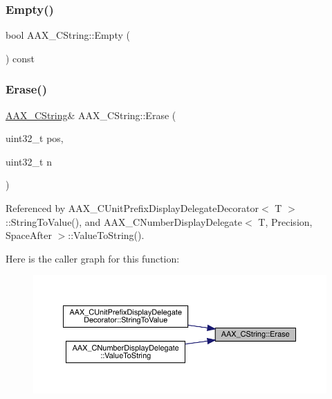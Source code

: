 \subsubsection{\texorpdfstring{Empty()}{Empty()}}
{\footnotesize\ttfamily bool A\+A\+X\+\_\+\+C\+String\+::\+Empty (\begin{DoxyParamCaption}{ }\end{DoxyParamCaption}) const}

\mbox{\label{a01573_a78ab9164c3b4aa17d13191fc7ea14fc0}} 
\subsubsection{\texorpdfstring{Erase()}{Erase()}}
{\footnotesize\ttfamily \mbox{\hyperlink{a01573}{A\+A\+X\+\_\+\+C\+String}}\& A\+A\+X\+\_\+\+C\+String\+::\+Erase (\begin{DoxyParamCaption}\item[{uint32\+\_\+t}]{pos,  }\item[{uint32\+\_\+t}]{n }\end{DoxyParamCaption})}



Referenced by A\+A\+X\+\_\+\+C\+Unit\+Prefix\+Display\+Delegate\+Decorator$<$ T $>$\+::\+String\+To\+Value(), and A\+A\+X\+\_\+\+C\+Number\+Display\+Delegate$<$ T, Precision, Space\+After $>$\+::\+Value\+To\+String().

Here is the caller graph for this function\+:
\nopagebreak
\begin{figure}[H]
\begin{center}
\leavevmode
\includegraphics[width=350pt]{a01573_a78ab9164c3b4aa17d13191fc7ea14fc0_icgraph}
\end{center}
\end{figure}
\mbox{\label{a01573_a53b726507fec5a24ffb46e9af194a958}} 
